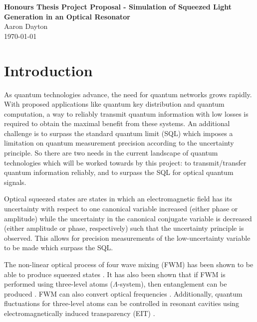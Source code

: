 \documentclass[aps,pra,showpacs,amsmath,amssymb,nofootinbib,longbibliography,superscriptaddress
]{revtex4-1}
\theoremstyle{definition}
\theoremstyle{remark}
\newcommand{\0}{\hat{0}}
\begin{document}



\begin{center}
    \textbf{\Large Honours Thesis Project Proposal - Simulation of Squeezed Light Generation in an Optical Resonator} \\ %
    \vspace{0.5cm} %
    \Large Aaron Dayton \\ %
    \vspace{0.3cm} %
    \today \\ %
\end{center}


\section{Introduction}

As quantum technologies advance, the need for quantum networks grows rapidly. With proposed applications like quantum key distribution and quantum computation, a way to reliably transmit quantum information with low losses is required to obtain the maximal benefit from these systems. An additional challenge is to surpass the standard quantum limit (SQL) which imposes a limitation on quantum measurement precision according to the uncertainty principle. So there are two needs in the current landscape of quantum technologies which will be worked towards by this project: to transmit/transfer quantum information reliably, and to surpass the SQL for optical quantum signals.


Optical squeezed states are states in which an electromagnetic field has its uncertainty with respect to one canonical variable increased (either phase or amplitude) while the uncertainty in the canonical conjugate variable is decreased (either amplitude or phase, respectively) such that the uncertainty principle is observed. This allows for precision measurements of the low-uncertainty variable to be made which surpass the SQL.

The non-linear optical process of four wave mixing (FWM) has been shown to be able to produce squeezed states \cite{FWMSS}. It has also been shown that if FWM is performed using three-level atoms ($\Lambda$-system), then entanglement can be produced \cite{FWMIE}. FWM can also convert optical frequencies \cite{FWMIE}. Additionally, quantum fluctuations for three-level atoms can be controlled in resonant cavities using electromagnetically induced transparency (EIT) \cite{CCQF}.
\end{document}
